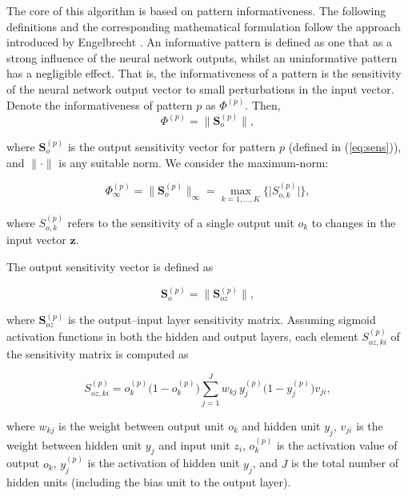 \documentclass[10pt, conference]{IEEEtran}
\begin{document}
The core of this algorithm is based on pattern informativeness. The following definitions and the corresponding mathematical formulation follow the approach introduced by Engelbrecht \cite{sasla}. An informative pattern is defined as one that as a strong influence of the neural network outputs, whilst an uninformative pattern has a negligible effect. That is, the informativeness of a pattern is the sensitivity of the neural network output vector to small perturbations in the input vector. Denote the informativeness of pattern $p$ as $\Phi^{(p)}$. Then,
\begin{equation}
	\Phi^{(p)} = \lVert \mathbf{S}_o^{(p)}	 \rVert,
	\label{eq:inform}
\end{equation}

where $\mathbf{S}_o^{(p)}$ is the output sensitivity vector for pattern $p$ (defined in (\ref{eq:sens})), and $\lVert \cdot \rVert$ is any suitable norm.  
We consider the maximum-norm:

\begin{equation}
	\Phi_{\infty}^(p) = \lVert \mathbf{S}_o^{(p)} \rVert_\infty 
	= \max_{k=1,\dots,K} \{ \big| S_{o,k}^{(p)} \big| \},
	\label{eq:mn}
\end{equation}

where $S_{o,k}^{(p)}$ refers to the sensitivity of a single output unit $o_k$ to changes in the input vector $\mathbf{z}$.  

The output sensitivity vector is defined as

\begin{equation}
	\mathbf{S}_o^{(p)} = \lVert \mathbf{S}_{oz}^{(p)} \rVert,
	\label{eq:sens}
\end{equation}

where $\mathbf{S}_{oz}^{(p)}$ is the output--input layer sensitivity matrix. Assuming sigmoid activation functions in both the hidden and output layers, each element $S_{oz,ki}^{(p)}$ of the sensitivity matrix is computed as

\begin{equation}
	S_{oz,ki}^{(p)} = o_k^{(p)} \big(1 - o_k^{(p)}\big) 
	\sum_{j=1}^{J} w_{kj} \, y_j^{(p)}\big(1 - y_j^{(p)}\big) v_{ji},
\end{equation}

where $w_{kj}$ is the weight between output unit $o_k$ and hidden unit $y_j$, $v_{ji}$ is the weight between hidden unit $y_j$ and input unit $z_i$, $o_k^{(p)}$ is the activation value of output $o_k$, $y_j^{(p)}$ is the activation of hidden unit $y_j$, and $J$ is the total number of hidden units (including the bias unit to the output layer).  
\end{document}
